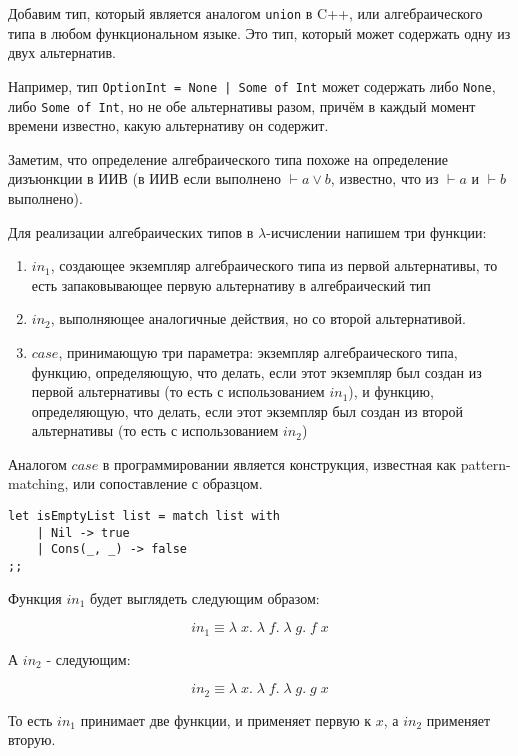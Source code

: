 Добавим тип, который является аналогом \texttt{union} в C++, или алгебраического типа в любом функциональном языке. Это тип, который может содержать одну из двух альтернатив.

Например, тип \texttt{OptionInt = None | Some of Int} может содержать либо \texttt{None}, либо \texttt{Some of Int}, но не обе альтернативы разом, причём в каждый момент времени известно, какую альтернативу он содержит.

Заметим, что определение алгебраического типа похоже на определение дизъюнкции в ИИВ (в ИИВ если выполнено $\vdash a \vee b$, известно, что из $\vdash a$ и $\vdash b$ выполнено).

Для реализации алгебраических типов в $\lambda$-исчислении напишем три функции:

\begin{enumerate}
	\item $in_1$, создающее экземпляр алгебраического типа из первой альтернативы, то есть запаковывающее первую альтернативу в алгебраический тип
	
	\item $in_2$, выполняющее аналогичные действия, но со второй альтернативой.
	
	\item $case$, принимающую три параметра: экземпляр алгебраического типа, функцию, определяющую, что делать, если этот экземпляр был создан из первой альтернативы (то есть с использованием $in_1$), и функцию, определяющую, что делать, если этот экземпляр был создан из второй альтернативы (то есть с использованием $in_2$)
\end{enumerate}

Аналогом $case$ в программировании является конструкция, известная как pattern-matching, или сопоставление с образцом.

\begin{verbatim}
let isEmptyList list = match list with
	| Nil -> true
	| Cons(_, _) -> false
;;
\end{verbatim}

Функция $in_1$ будет выглядеть следующим образом: 

$$in_1 \equiv \lambda \; x. \; \lambda \; f. \; \lambda \; g. \; f \; x$$

А $in_2$ -  следующим:

$$in_2 \equiv \lambda \; x. \; \lambda \; f. \; \lambda \; g. \; g \; x$$

То есть $in_1$ принимает две функции, и применяет первую к $x$, а $in_2$ применяет вторую.

